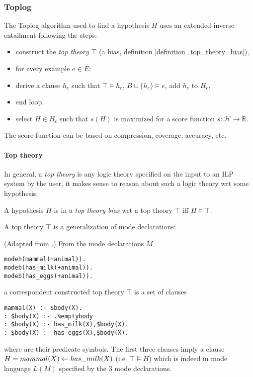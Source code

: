 \subsubsection{Toplog\cite{muggleton2008toplog}\cite{corapi2011nonmonotonic}}
The Toplog algorithm used to find a hypothesis $H$ uses an extended inverse entailment following the steps:

\begin{itemize}
\item construct the \emph{top theory} $\top$ (a bias, definition \ref{definition_top_theory_bias}),
\item for every example $e \in E$:
\item derive a clause $h_e$ such that $\top \models h_e$, $B \cup \{h_e\} \models e$, add $h_e$ to $H_c$,
\item end loop,
\item select $H \in H_c$ such that $s(H)$ is maximized for a score function $s:\mathcal{H} \to \mathbb{R}$.
\end{itemize}
The score function can be based on compression, coverage, accuracy, etc.

\paragraph{Top theory\cite{muggleton2008toplog}}\label{top_theory}
In general, a \emph{top theory} is any logic theory specified on the input to an ILP system by the user, it makes sense to reason about such a logic theory wrt some hypothesis.
\begin{defn}\label{definition_top_theory_bias}
A hypothesis $H$ is in a \emph{top theory bias} wrt a top theory $\top$ iff $H \models \top$.
\end{defn}
A top theory $\top$ is a generalization of mode declarations:
\begin{exmp}(Adapted from \cite{muggleton2008toplog}.)
From the mode declarations $M$
\begin{lstlisting}
modeh(mammal(+animal)).
modeb(has_milk(+animal)).
modeb(has_eggs(+animal)).
\end{lstlisting}
a correspondent constructed top theory $\top$ is a set of clauses
\begin{lstlisting}
mammal(X) :- $body(X).
: $body(X) :- .%emptybody
: $body(X) :- has_milk(X),$body(X).
: $body(X) :- has_eggs(X),$body(X).
\end{lstlisting}
where  are their predicate symbols.
The first three clauses imply a clause $H=mammal(X) \leftarrow has\_milk(X)$ (i.e. $\top \models H$)
which is indeed in mode language $L(M)$ specified by the 3 mode declarations.
\end{exmp}

